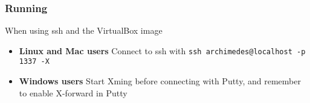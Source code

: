 \begin{frame}

\frametitle{Running \kudos{}}

\vspace{\fill}
\begin{center}
    When using ssh and the VirtualBox image
\end{center}
\begin{itemize}
    \item \textbf{Linux and Mac users} Connect to ssh with \lstinline{ssh archimedes@localhost -p 1337 -X}
    \item \textbf{Windows users} Start Xming before connecting with Putty, and remember to enable X-forward in Putty
\end{itemize}

\vspace{\fill}

\end{frame}
